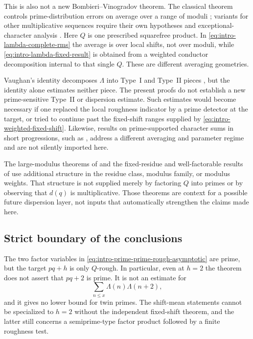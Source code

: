 This is also not a new Bombieri--Vinogradov theorem.  The classical theorem
controls prime-distribution errors on average over a range of moduli
\citep{Bombieri1965,Vinogradov1965}; variants for other multiplicative
sequences require their own hypotheses and exceptional-character analysis
\citep{GranvilleShao2018}.  Here $Q$ is one prescribed squarefree product.
In \eqref{eq:intro-lambda-complete-rms} the average is over local shifts, not
over moduli, while \eqref{eq:intro-lambda-fixed-result} is obtained from a
weighted conductor decomposition internal to that single $Q$.  These are
different averaging geometries.

Vaughan's identity decomposes $\Lambda$ into Type~I and Type~II pieces
\citep{Vaughan1977}, but the identity alone estimates neither piece.  The
present proofs do not establish a new prime-sensitive Type~II or dispersion
estimate.  Such estimates would become necessary if one replaced the local
roughness indicator by a prime detector at the target, or tried to continue
past the fixed-shift ranges supplied by \eqref{eq:intro-weighted-fixed-shift}.
Likewise, results on prime-supported character sums in short progressions,
such as \citet{Puchta2003}, address a different averaging and parameter
regime and are not silently imported here.

The large-modulus theorems of
\citet{BombieriFriedlanderIwaniec1986} and the fixed-residue and
well-factorable results of
\citet{Maynard2025FixedResidue,Maynard2025WellFactorable} use additional
structure in the residue class, modulus family, or modulus weights.  That
structure is not supplied merely by factoring $Q$ into primes or by observing
that $d(q)$ is multiplicative.  Those theorems are context for a possible
future dispersion layer, not inputs that automatically strengthen the
claims made here.

\subsection{Strict boundary of the conclusions}

The two factor variables in \eqref{eq:intro-prime-prime-rough-asymptotic}
are prime, but the target $pq+h$ is only $Q$-rough.  In particular, even at
$h=2$ the theorem does not assert that $pq+2$ is prime.  It is not an
estimate for
\[
 \sum_{n\le x}\Lambda(n)\Lambda(n+2),
\]
and it gives no lower bound for twin primes.  The shift-mean statements
cannot be specialized to $h=2$ without the independent fixed-shift theorem,
and the latter still concerns a semiprime-type factor product followed by a
finite roughness test.

